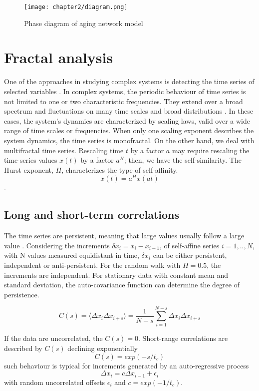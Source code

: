 \begin{figure}[h]
	\centering
	\texttt{[image: chapter2/diagram.png]}
	\caption[Phase diagram of aging network model]{Phase diagram of aging network model}
	\label{fig:diagram}
\end{figure}


\section{Fractal analysis}

One of the approaches in studying complex systems is detecting the time series of selected variables \cite{kantelhardt2008fractal}. In complex systems, the periodic behaviour of time series is not limited to one or two characteristic frequencies. They extend over a broad spectrum and fluctuations on many time scales and broad distributions \cite{fan2012fractal, sidorov2018fractality}. In these cases, the system's dynamics are characterized by scaling laws, valid over a wide range of time scales or frequencies. When only one scaling exponent describes the system dynamics, the time series is monofractal.
On the other hand, we deal with multifractal time series. Rescaling time $t$ by a factor $a$ may require rescaling the time-series values $x(t)$ by a factor $a^H$; then, we have the self-similarity. The Hurst exponent, $H$, characterizes the type of self-affinity. 
$$x(t) = a^Hx(at)$$. 

\subsection{Long and short-term correlations}
The time series are persistent, meaning that large values usually follow a large value \cite{kantelhardt2008fractal}. Considering the increments $\delta x_i = x_i - x_{i-1}$, of self-affine series $i = 1,.., N$, with N values measured equidistant in time, $\delta x_i$ can be either persistent, independent or anti-persistent. For the random walk with $H=0.5$, the increments are independent. For stationary data with constant mean and standard deviation, the auto-covariance function can determine the degree of persistence. 

\begin{equation}
C(s) = \langle \Delta x_i \Delta x_{i+s} \rangle = \frac{1}{N-s} \sum_{i=1}^{N-s}\Delta x_i \Delta x_{i+s}
\end{equation}


If the data are uncorrelated, the $C(s)=0$. Short-range correlations are described by $C(s)$ declining exponentially
$$C(s) = exp(-s/t_c)$$
such behaviour is typical for increments generated by an auto-regressive process 
$$ \Delta x_i = c\Delta x_{i-1} + \epsilon_i $$
with random uncorrelated offsets $\epsilon_i$ and $c = exp(-1/t_c)$.

